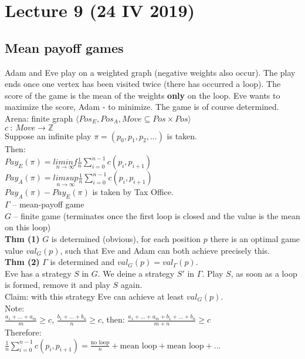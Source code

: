 \section{Lecture 9 (24 IV 2019)}
\subsection*{Mean payoff games}
Adam and Eve play on a weighted graph (negative weights also occur). The play ends
once one vertex has been visited twice (there has occurred a loop). The score of the
game is the mean of the weights \textbf{only} on the loop. Eve wants to maximize the
score, Adam - to minimize. The game is of course determined.\\

\noindent
Arena: finite graph $\langle Pos_E, Pos_A, Move \subseteq Pos \times Pos \rangle$\\
$c\ :\ Move \longrightarrow \mathbb{Z}$\\
Suppose an infinite play $\pi = (p_0, p_1, p_2, ...)$ is taken.\\
Then:\\
$Pay_E(\pi) = \underset{n \rightarrow \infty}{lim inf} \frac{1}{n} \sum_{i=0}^{n-1} c(p_i, p_{i+1})$\\
$Pay_A(\pi) = \underset{n \rightarrow \infty}{lim sup} \frac{1}{n} \sum_{i=0}^{n-1} c(p_i, p_{i+1})$\\
$Pay_A(\pi) - Pay_E(\pi)$ is taken by Tax Office.\\

\noindent
$\Gamma$ -- mean-payoff game\\
$G$ -- finite game (terminates once the first loop is closed and the value is the mean on this loop)\\

\noindent
\textbf{Thm (1)} $G$ is determined (obvious), for each position $p$ there is an optimal game value
$val_G(p)$, such that Eve and Adam can both achieve precisely this.\\

\noindent
\textbf{Thm (2)} $\Gamma$ is determined and $val_G(p) = val_{\Gamma}(p)$.\\
Eve has a strategy $S$ in $G$. We deine a strategy $S'$ in $\Gamma$.
Play $S$, as soon as a loop is formed, remove it and play $S$ again.\\
Claim: with this strategy Eve can achieve at least $val_{G}(p)$.\\
Note:\\
$\frac{a_1+...+a_m}{m} \geq c$, $\frac{b_1+...+b_n}{n} \geq c$, then:
$\frac{a_1+...+a_m+b_1+...+b_n}{m+n} \geq c$\\
Therefore:\\
$\frac{1}{n} \sum_{i=0}^{n-1} c(p_i,p_{i+1}) = \frac{\text{no loop}}{n} + \text{mean loop} + \text{mean loop} + ...$\\

